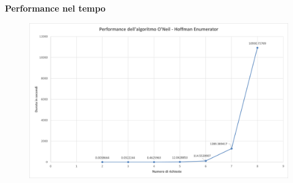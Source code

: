 \documentclass[9pt]{beamer}
\begin{document}
\begin{frame}{\subsecname}
	\textbf{Performance nel tempo}
      	\begin{figure}[h]
	\centering
	\includegraphics[width=\textwidth]
	{../charts/02 Performance dell'algoritmo O'Neil - Hoffman Enumerator}
	\end{figure}

\end{frame}
\end{document}
